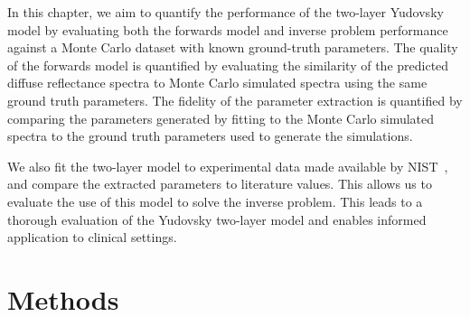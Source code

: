 In this chapter, we aim to quantify the performance of the two-layer Yudovsky model by evaluating both the forwards model and inverse problem performance against a Monte Carlo dataset with known ground-truth parameters. The quality of the forwards model is quantified by evaluating the similarity of the predicted diffuse reflectance spectra to Monte Carlo simulated spectra using the same ground truth parameters. The fidelity of the parameter extraction is quantified by comparing the parameters generated by fitting to the Monte Carlo simulated spectra to the ground truth parameters used to generate the simulations.

We also fit the two-layer model to experimental data made available by NIST~\citep{Cooksey2017}, and compare the extracted parameters to literature values. This allows us to evaluate the use of this model to solve the inverse problem.
This leads to a thorough evaluation of the Yudovsky two-layer model and enables informed application to clinical settings. 

\section{Methods}\label{sec:methods2}

